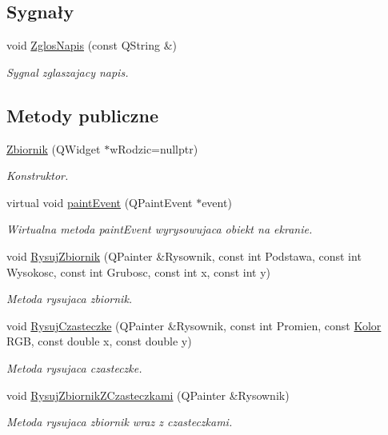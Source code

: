 \subsection*{Sygnały}
\begin{DoxyCompactItemize}
\item 
void \hyperlink{class_zbiornik_a2d92e4a46f9a5dda37ddd9948046580b}{Zglos\-Napis} (const Q\-String \&)
\begin{DoxyCompactList}\small\item\em Sygnal zglaszajacy napis. \end{DoxyCompactList}\end{DoxyCompactItemize}
\subsection*{Metody publiczne}
\begin{DoxyCompactItemize}
\item 
\hyperlink{class_zbiornik_aa71a4d405b5d2c72d2a9e5cf9c5becfa}{Zbiornik} (Q\-Widget $\ast$w\-Rodzic=nullptr)
\begin{DoxyCompactList}\small\item\em Konstruktor. \end{DoxyCompactList}\item 
virtual void \hyperlink{class_zbiornik_af7a9c185e95b92de342c6dc69f020765}{paint\-Event} (Q\-Paint\-Event $\ast$event)
\begin{DoxyCompactList}\small\item\em Wirtualna metoda paint\-Event wyrysowujaca obiekt na ekranie. \end{DoxyCompactList}\item 
void \hyperlink{class_zbiornik_ad15f40d418d9ebf261de0eabe8cc2906}{Rysuj\-Zbiornik} (Q\-Painter \&Rysownik, const int Podstawa, const int Wysokosc, const int Grubosc, const int x, const int y)
\begin{DoxyCompactList}\small\item\em Metoda rysujaca zbiornik. \end{DoxyCompactList}\item 
void \hyperlink{class_zbiornik_ad93223745351d4d18f64c5c43dfc5fdc}{Rysuj\-Czasteczke} (Q\-Painter \&Rysownik, const int Promien, const \hyperlink{class_kolor}{Kolor} R\-G\-B, const double x, const double y)
\begin{DoxyCompactList}\small\item\em Metoda rysujaca czasteczke. \end{DoxyCompactList}\item 
void \hyperlink{class_zbiornik_af831a2751191eab54fb6438392ac6edb}{Rysuj\-Zbiornik\-Z\-Czasteczkami} (Q\-Painter \&Rysownik)
\begin{DoxyCompactList}\small\item\em Metoda rysujaca zbiornik wraz z czasteczkami. \end{DoxyCompactList}\end{DoxyCompactItemize}
